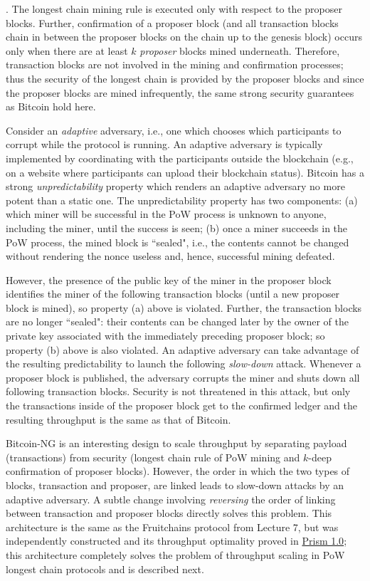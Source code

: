 \documentclass{article}
\begin{document}
. The longest chain mining rule is executed only with respect to the proposer blocks. Further, confirmation of a  proposer block (and all transaction blocks chain in between the proposer blocks on the chain up to the genesis block)  occurs only when there are at least $k$ {\em proposer} blocks mined underneath. Therefore, transaction blocks are not involved in the mining and confirmation processes; thus the security of the longest chain is provided by the proposer blocks and  since the proposer blocks are mined infrequently, the same strong security guarantees as Bitcoin hold here. 

 Consider an {\em adaptive} adversary, i.e., one which chooses which participants to corrupt while the protocol is running.  An adaptive adversary is typically implemented by coordinating with the participants outside the blockchain (e.g., on a website where participants can upload their blockchain status). Bitcoin has a strong {\em unpredictability} property which renders an adaptive adversary no more potent than a static one. The unpredictability property has  two components: (a) which miner will be successful in the PoW process is unknown to anyone, including the miner, until the success is seen; (b) once a miner succeeds in the PoW process, the mined block is ``sealed", i.e., the contents cannot be changed without rendering the nonce useless and, hence, successful mining defeated. 
 
 However, the presence of the public key of the miner in the proposer block identifies the miner of the following transaction blocks (until a new proposer block is mined), so property (a) above is violated. Further, the transaction blocks are no longer ``sealed": their contents can be changed later by the owner of the private key associated with the immediately preceding proposer block; so property (b) above is also violated. An adaptive adversary can take advantage of the resulting predictability to  launch the following {\em slow-down} attack. Whenever a proposer block is published, the adversary corrupts the miner and shuts down all following transaction blocks.  Security is not threatened in this attack, but  only the transactions inside of the proposer block get to the confirmed ledger and the resulting  throughput is the same as that of Bitcoin. 
 
 {\sf Bitcoin-NG} is an interesting design to scale throughput by separating payload (transactions) from security (longest chain rule of PoW mining and $k$-deep confirmation of proposer blocks). However, the order in which the two types of blocks, transaction and proposer, are linked leads to slow-down attacks by an adaptive adversary. A subtle change involving {\em reversing} the order of linking between transaction and proposer blocks directly solves this problem. This architecture is the same as the {\sf Fruitchains} protocol from Lecture 7, but was independently constructed and its throughput optimality proved in  \href{https://arxiv.org/pdf/1810.08092v3.pdf}{{\sf Prism 1.0}}; this architecture  completely solves the problem of throughput scaling in PoW longest chain protocols and is described next. 
\end{document}
